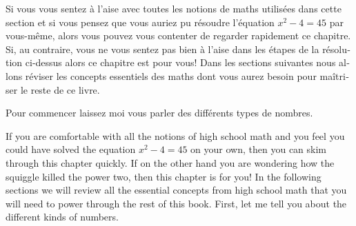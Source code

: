 \begin{paracol}{2}

	\begin{leftcolumn*}

		\begin{otherlanguage}{french}
	Si vous vous sentez à l'aise avec toutes les notions de maths utilisées dans cette section
	et si vous pensez que vous auriez pu résoudre l'équation $x^2-4=45$ par vous-même,
	alors vous pouvez vous contenter de regarder rapidement ce chapitre.
	Si, au contraire, vous ne vous sentez pas bien à l'aise dans les étapes de la résolution ci-dessus alors ce chapitre est pour vous!
	Dans les sections suivantes nous allons réviser les concepts essentiels des maths dont vous aurez besoin pour maîtriser le reste de ce livre.
	
	Pour commencer laissez moi vous parler des différents types de nombres.


		\end{otherlanguage}

	\end{leftcolumn*}



	\begin{rightcolumn}

	If you are comfortable with all the notions of high school math
	and you feel you could have solved the equation $x^2-4=45$ on your own,		%
	then you can skim through this chapter quickly.
	If on the other hand you are wondering how the squiggle killed the power two,
	then this chapter is for you!
	In the following sections we will review all the essential concepts from
	high school math that you will need to power through the rest of this book.
	First, let me tell you about the different kinds of numbers.



	\end{rightcolumn}

\end{paracol}
